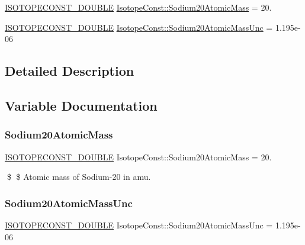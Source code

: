 \begin{DoxyCompactItemize}
\item 
\mbox{\hyperlink{group___isotope_const-_macros_ga8f45a7272ce02c0b4c65c44636ed719a}{I\+S\+O\+T\+O\+P\+E\+C\+O\+N\+S\+T\+\_\+\+D\+O\+U\+B\+LE}} \mbox{\hyperlink{group___isotope_const-_sodium-_na20_ga89631438b49b736391aa34fe7ea92905}{Isotope\+Const\+::\+Sodium20\+Atomic\+Mass}} = 20.
\item 
\mbox{\hyperlink{group___isotope_const-_macros_ga8f45a7272ce02c0b4c65c44636ed719a}{I\+S\+O\+T\+O\+P\+E\+C\+O\+N\+S\+T\+\_\+\+D\+O\+U\+B\+LE}} \mbox{\hyperlink{group___isotope_const-_sodium-_na20_gaadfc9b5a70b7821ab01c12166aeeb54a}{Isotope\+Const\+::\+Sodium20\+Atomic\+Mass\+Unc}} = 1.\+195e-\/06
\end{DoxyCompactItemize}


\subsection{Detailed Description}


\subsection{Variable Documentation}
\mbox{\label{group___isotope_const-_sodium-_na20_ga89631438b49b736391aa34fe7ea92905}} 
\subsubsection{\texorpdfstring{Sodium20\+Atomic\+Mass}{Sodium20AtomicMass}}
{\footnotesize\ttfamily \mbox{\hyperlink{group___isotope_const-_macros_ga8f45a7272ce02c0b4c65c44636ed719a}{I\+S\+O\+T\+O\+P\+E\+C\+O\+N\+S\+T\+\_\+\+D\+O\+U\+B\+LE}} Isotope\+Const\+::\+Sodium20\+Atomic\+Mass = 20.}

\$ \$ Atomic mass of Sodium-\/20 in amu. \mbox{\label{group___isotope_const-_sodium-_na20_gaadfc9b5a70b7821ab01c12166aeeb54a}} 
\subsubsection{\texorpdfstring{Sodium20\+Atomic\+Mass\+Unc}{Sodium20AtomicMassUnc}}
{\footnotesize\ttfamily \mbox{\hyperlink{group___isotope_const-_macros_ga8f45a7272ce02c0b4c65c44636ed719a}{I\+S\+O\+T\+O\+P\+E\+C\+O\+N\+S\+T\+\_\+\+D\+O\+U\+B\+LE}} Isotope\+Const\+::\+Sodium20\+Atomic\+Mass\+Unc = 1.\+195e-\/06}

